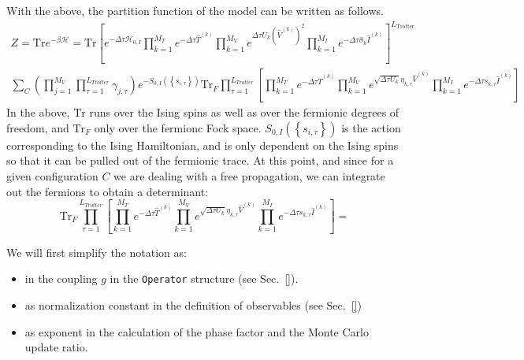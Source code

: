 With the above, the partition function of the model can be written as follows.
\begin{eqnarray}
Z = \text {Tr}   e^{-\beta \mathcal{H} } =   \text {Tr}  \left[ e^{-\Delta \tau \mathcal{H}_{0,I}}   \prod_{k=1}^{M_T}   e^{-\Delta \tau \hat{T}^{(k)}}  
    \prod_{k=1}^{M_V}   e^{  \Delta \tau  U_k \left(  \hat{V}^{(k)} \right)^2}   \prod_{k=1}^{M_I}   e^{  -\Delta \tau  \hat{\sigma}_{k}  \hat{I}^{(k)}} 
   \right]^{L_{\text{Trotter}}}  \nonumber \\
   \sum_{C} \left( \prod_{j=1}^{M_V} \prod_{\tau=1}^{L_{Trotter}} \gamma_{j,\tau} \right) e^{-S_{0,I} \left( \left\{ s_{i,\tau} \right\}  \right) } 
    \text {Tr}_{F}   \prod_{\tau=1}^{L_{Trotter}} \left[   \prod_{k=1}^{M_T}   e^{-\Delta \tau \hat{T}^{(k)}}  
    \prod_{k=1}^{M_V}   e^{  \sqrt{ \Delta \tau  U_k} \eta_{k,\tau} \hat{V}^{(k)} }   \prod_{k=1}^{M_I}   e^{  -\Delta \tau s_{k,\tau}  \hat{I}^{(k)}}  \right] \nonumber
\end{eqnarray}
In the above,  $\text {Tr} $  runs over the Ising spins as well as over the fermionic degrees of freedom, and $ \text {Tr}_{F}  $ only over the  fermionc Fock space. 
$S_{0,I} \left( \left\{ s_{i,\tau} \right\}  \right)  $ is the action  corresponding to the Ising Hamiltonian,  and is only dependent on the Ising spins so that  it can be pulled out of the fermionic trace.
At this point,  and  since for a given configuration $C$  we are dealing with a free propagation, we can integrate out the fermions to obtain a determinant: 
\begin{equation}
 \text {Tr}_{F}   \prod_{\tau=1}^{L_{Trotter}} \left[   \prod_{k=1}^{M_T}   e^{-\Delta \tau \hat{T}^{(k)}}  
    \prod_{k=1}^{M_V}   e^{  \sqrt{ \Delta \tau  U_k} \eta_{k,\tau} \hat{V}^{(k)} }   \prod_{k=1}^{M_I}   e^{  -\Delta \tau s_{k,\tau}  \hat{I}^{(k)}}  \right]  = 
\end{equation}

 We will first  simplify the notation as: 





\begin{itemize}
\item in the coupling $g$ in the \texttt{Operator} structure (see Sec.~\ref{}).
\item as normalization constant in the definition of observables (see Sec.~\ref{})
\item as exponent in the calculation of the phase factor and the Monte Carlo update ratio.
\end{itemize}



